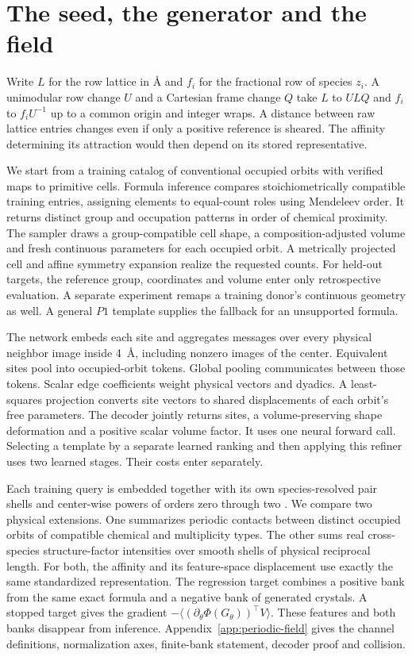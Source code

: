 \documentclass[10pt]{article}
\begin{document}
\section{The seed, the generator and the field}
Write $L$ for the row lattice in \AA{} and $f_i$ for the fractional row of species $z_i$. A unimodular row change $U$ and a Cartesian frame change $Q$ take $L$ to $ULQ$ and $f_i$ to $f_iU^{-1}$ up to a common origin and integer wraps. A distance between raw lattice entries changes even if only a positive reference is sheared. The affinity determining its attraction would then depend on its stored representative.

We start from a training catalog of conventional occupied orbits with verified maps to primitive cells. Formula inference compares stoichiometrically compatible training entries, assigning elements to equal-count roles using Mendeleev order. It returns distinct group and occupation patterns in order of chemical proximity. The sampler draws a group-compatible cell shape, a composition-adjusted volume and fresh continuous parameters for each occupied orbit. A metrically projected cell and affine symmetry expansion realize the requested counts. For held-out targets, the reference group, coordinates and volume enter only retrospective evaluation. A separate experiment remaps a training donor's continuous geometry as well. A general $P1$ template supplies the fallback for an unsupported formula.

The network embeds each site and aggregates messages over every physical neighbor image inside 4~\AA, including nonzero images of the center. Equivalent sites pool into occupied-orbit tokens. Global pooling communicates between those tokens. Scalar edge coefficients weight physical vectors and dyadics. A least-squares projection converts site vectors to shared displacements of each orbit's free parameters. The decoder jointly returns sites, a volume-preserving shape deformation and a positive scalar volume factor. It uses one neural forward call. Selecting a template by a separate learned ranking and then applying this refiner uses two learned stages. Their costs enter separately.

Each training query is embedded together with its own species-resolved pair shells and center-wise powers of orders zero through two \cite{soap}. We compare two physical extensions. One summarizes periodic contacts between distinct occupied orbits of compatible chemical and multiplicity types. The other sums real cross-species structure-factor intensities over smooth shells of physical reciprocal length. For both, the affinity and its feature-space displacement use exactly the same standardized representation. The regression target combines a positive bank from the same exact formula and a negative bank of generated crystals. A stopped target gives the gradient $-\langle(\partial_\theta\Phi(G_\theta))^\top V\rangle$. These features and both banks disappear from inference. Appendix~\ref{app:periodic-field} gives the channel definitions, normalization axes, finite-bank statement, decoder proof and collision.
\end{document}
